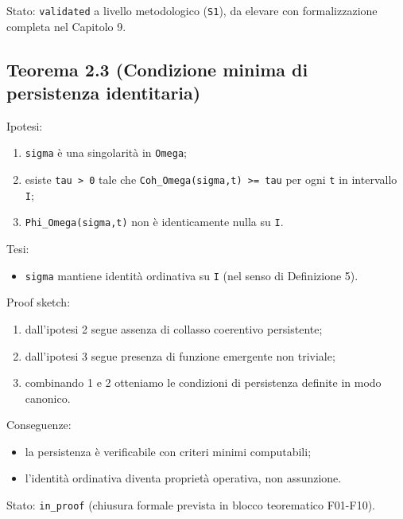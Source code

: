 Stato: \texttt{validated} a livello metodologico (\texttt{S1}), da elevare con formalizzazione completa nel Capitolo 9.

\subsection{Teorema 2.3 (Condizione minima di persistenza identitaria)}

Ipotesi:

\begin{enumerate}
\def\labelenumi{\arabic{enumi}.}
\tightlist
\item
  \texttt{sigma} è una singolarità in \texttt{Omega};
\item
  esiste \texttt{tau\ \textgreater{}\ 0} tale che \texttt{Coh\_Omega(sigma,t)\ \textgreater{}=\ tau} per ogni \texttt{t} in intervallo \texttt{I};
\item
  \texttt{Phi\_Omega(sigma,t)} non è identicamente nulla su \texttt{I}.
\end{enumerate}

Tesi:

\begin{itemize}
\tightlist
\item
  \texttt{sigma} mantiene identità ordinativa su \texttt{I} (nel senso di Definizione 5).
\end{itemize}

Proof sketch:

\begin{enumerate}
\def\labelenumi{\arabic{enumi}.}
\tightlist
\item
  dall'ipotesi 2 segue assenza di collasso coerentivo persistente;
\item
  dall'ipotesi 3 segue presenza di funzione emergente non triviale;
\item
  combinando 1 e 2 otteniamo le condizioni di persistenza definite in modo canonico.
\end{enumerate}

Conseguenze:

\begin{itemize}
\tightlist
\item
  la persistenza è verificabile con criteri minimi computabili;
\item
  l'identità ordinativa diventa proprietà operativa, non assunzione.
\end{itemize}

Stato: \texttt{in\_proof} (chiusura formale prevista in blocco teorematico F01-F10).

